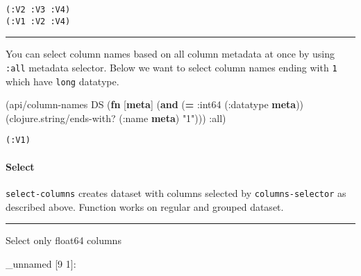 \documentclass[]{article}
\newenvironment{Shaded}{\begin{snugshade}}{\end{snugshade}}
\newcommand{\KeywordTok}[1]{\textcolor[rgb]{0.13,0.29,0.53}{\textbf{#1}}}
\newcommand{\StringTok}[1]{\textcolor[rgb]{0.31,0.60,0.02}{#1}}
\newcommand{\VariableTok}[1]{\textcolor[rgb]{0.00,0.00,0.00}{#1}}
\newcommand{\AttributeTok}[1]{\textcolor[rgb]{0.77,0.63,0.00}{#1}}
\newcommand{\NormalTok}[1]{#1}
\let\oldparagraph\paragraph
\renewcommand{\paragraph}[1]{\oldparagraph{#1}\mbox{}}
\begin{document}
\begin{verbatim}
(:V2 :V3 :V4)
(:V1 :V2 :V4)
\end{verbatim}

\begin{center}\rule{0.5\linewidth}{0.5pt}\end{center}

You can select column names based on all column metadata at once by
using \texttt{:all} metadata selector. Below we want to select column
names ending with \texttt{1} which have \texttt{long} datatype.

\begin{Shaded}
\begin{Highlighting}[]
\NormalTok{(api/column-names DS (}\KeywordTok{fn}\NormalTok{ [}\KeywordTok{meta}\NormalTok{]}
\NormalTok{                       (}\KeywordTok{and}\NormalTok{ (}\KeywordTok{=} \AttributeTok{:int64}\NormalTok{ (}\AttributeTok{:datatype} \KeywordTok{meta}\NormalTok{))}
\NormalTok{                            (clojure.string/ends-with? (}\AttributeTok{:name} \KeywordTok{meta}\NormalTok{) }\StringTok{"1"}\NormalTok{))) }\AttributeTok{:all}\NormalTok{)}
\end{Highlighting}
\end{Shaded}

\begin{verbatim}
(:V1)
\end{verbatim}

\paragraph{Select}\label{select}

\texttt{select-columns} creates dataset with columns selected by
\texttt{columns-selector} as described above. Function works on regular
and grouped dataset.

\begin{center}\rule{0.5\linewidth}{0.5pt}\end{center}

Select only float64 columns

\begin{Shaded}
\end{Shaded}

\_unnamed {[}9 1{]}:
\end{document}
